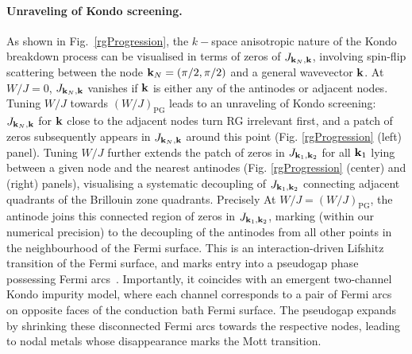 \documentclass[%
 reprint,
superscriptaddress,
groupedaddress,
 amsmath,amssymb,
 aps,
prl
]{revtex4-2}
\begin{document}
\paragraph*{Unraveling of Kondo screening.} 
As shown in Fig.~\ref{rgProgression}, the $k-$space anisotropic nature of the Kondo breakdown process 
can be visualised in terms of zeros of $J_{{\bf k}_N, {\bf k}}$, involving spin-flip scattering between the node ${\bf k}_N = (\pi/2, \pi/2)$  and a general wavevector ${\bf k}$. 
At $W/J=0$, $J_{{\bf k}_N, {\bf k}}$ vanishes if ${\bf k}$ is either any of the antinodes or adjacent nodes. 
Tuning $W/J$ %
towards $(W/J)_{\text{PG}}$ leads to an unraveling of Kondo screening:
$J_{{\bf k}_N, {\bf k}}$ for ${\bf k}$ close to the adjacent nodes turn RG irrelevant first, and a patch of zeros subsequently appears in $J_{{\bf k}_N, {\bf k}}$ around this point (Fig. \ref{rgProgression} (left) panel). %
Tuning $W/J$ further extends the patch of zeros
in $J_{{\bf k}_1, {\bf k}_2}$ for all ${\bf k}_{1}$ lying between a given node and the nearest antinodes (Fig. \ref{rgProgression} (center) and (right) panels), visualising a systematic decoupling of $J_{{\bf k}_1, {\bf k}_2}$ connecting adjacent quadrants of the Brillouin zone quadrants. 
Precisely At $W/J=(W/J)_{\text{PG}}$, the antinode joins this connected region of zeros in $J_{{\bf k}_1, {\bf k}_2}$, %
marking (within our numerical precision) to the decoupling of the antinodes from all other points in the neighbourhood of the Fermi surface. This is an interaction-driven Lifshitz transition of the Fermi surface, and marks entry into a pseudogap phase possessing Fermi arcs~\cite{WuFerrero2018}. Importantly, it coincides with an emergent two-channel Kondo impurity model, where each channel corresponds to a pair of Fermi arcs on opposite faces of the conduction bath Fermi surface. 
The pseudogap expands by shrinking these disconnected Fermi arcs towards the respective nodes, leading to nodal metals whose disappearance marks the Mott transition. 
\end{document}
